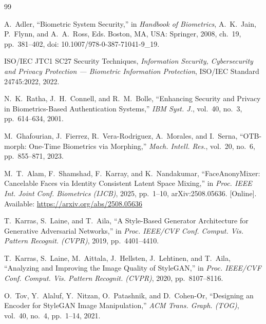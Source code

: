 \documentclass[oneside,a4paper,12pt]{extarticle}
\begin{document}
\clearpage
{}
{}
\begin{thebibliography}{99}

A.~Adler, ``Biometric System Security,'' in \textit{Handbook of Biometrics}, A.~K.~Jain, P.~Flynn, and A.~A.~Ross, Eds. Boston, MA, USA: Springer, 2008, ch.~19, pp.~381--402, doi: 10.1007/978-0-387-71041-9\_19.

ISO/IEC JTC1 SC27 Security Techniques, \textit{Information Security, Cybersecurity and Privacy Protection --- Biometric Information Protection}, ISO/IEC Standard 24745:2022, 2022.

N.~K.~Ratha, J.~H.~Connell, and R.~M.~Bolle, ``Enhancing Security and Privacy in Biometrics-Based Authentication Systems,'' \textit{IBM Syst. J.}, vol.~40, no.~3, pp.~614--634, 2001.

M.~Ghafourian, J.~Fierrez, R.~Vera-Rodriguez, A.~Morales, and I.~Serna, ``OTB-morph: One-Time Biometrics via Morphing,'' \textit{Mach. Intell. Res.}, vol.~20, no.~6, pp.~855--871, 2023.

M.~T.~Alam, F.~Shamshad, F.~Karray, and K.~Nandakumar, ``FaceAnonyMixer: Cancelable Faces via Identity Consistent Latent Space Mixing,'' in \textit{Proc. IEEE Int. Joint Conf. Biometrics (IJCB)}, 2025, pp.~1--10, arXiv:2508.05636. [Online]. Available: \url{https://arxiv.org/abs/2508.05636}

T.~Karras, S.~Laine, and T.~Aila, ``A Style-Based Generator Architecture for Generative Adversarial Networks,'' in \textit{Proc. IEEE/CVF Conf. Comput. Vis. Pattern Recognit. (CVPR)}, 2019, pp.~4401--4410.

T.~Karras, S.~Laine, M.~Aittala, J.~Hellsten, J.~Lehtinen, and T.~Aila, ``Analyzing and Improving the Image Quality of StyleGAN,'' in \textit{Proc. IEEE/CVF Conf. Comput. Vis. Pattern Recognit. (CVPR)}, 2020, pp.~8107--8116.

O.~Tov, Y.~Alaluf, Y.~Nitzan, O.~Patashnik, and D.~Cohen-Or, ``Designing an Encoder for StyleGAN Image Manipulation,'' \textit{ACM Trans. Graph. (TOG)}, vol.~40, no.~4, pp.~1--14, 2021.


\end{thebibliography}
\end{document}
